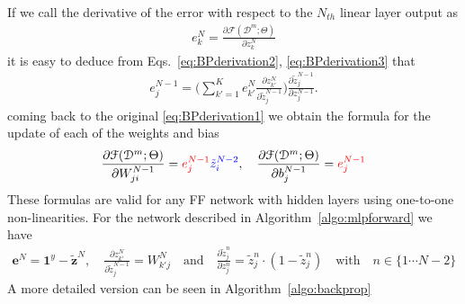 %
If we call the derivative of the error with respect to the $N_{th}$ linear layer output as
\begin{align}
        e^{N}_k = \frac{\partial \mathcal{F}(\mathcal{D}^m;\Theta)}{\partial z_{k}^{N}}
\label{eq:BPderivation4}
\end{align}
%
\noindent it is easy to deduce from Eqs.~\ref{eq:BPderivation2}, \ref{eq:BPderivation3} that
%
\begin{align}
        e^{N-1}_j = \bigg(\sum_{k'=1}^{K} e^N_{k'} \frac{\partial z_{k'}^{N}}{\partial \tilde{z}_{j}^{N-1}}\bigg)\frac{\partial \tilde{z}_{j}^{N-1}}{\partial z_{j}^{N-1}}.
\label{eq:BPderivation5}
\end{align}
%
\noindent coming back to the original \ref{eq:BPderivation1} we obtain the formula for the update of each of the weights and bias
%
\begin{align}
        \frac{\partial \mathcal{F}(\mathcal{D}^m;\Theta)}{\partial W_{ji}^{N-1}}  = {\color{red} e^{N-1}_j} {\color{blue} \tilde{z}_i^{N-2}},  \quad \frac{\partial \mathcal{F}(\mathcal{D}^m;\Theta)}{\partial b_{j}^{N-1}}  = {\color{red} e^{N-1}_j}
\label{eq:BPderivation6}
\end{align}
%
These formulas are valid for any FF network with hidden layers using one-to-one non-linearities. For the network described in Algorithm~\ref{algo:mlpforward} we have
%
\begin{align}
        \mathbf{e}^{N} =  \mathrm{\mathbf{1}}^{y} - \tilde{\mathbf{z}}^N,
  \quad
        \frac{\partial z_{k'}^N}{\partial \tilde{z}_j^{N-1}} = W_{k'j}^N \quad \mbox{and} \quad
        \frac{\partial \tilde{z}_{j}^n}{\partial z_{j}^n} = \tilde{z}^n_{j}\cdot (1-\tilde{z}^n_{j}) \quad \mbox{with} \quad n \in \{1 \cdots N-2\}
\label{eq:BPderivation7}
\end{align}
%
A more detailed version can be seen in Algorithm~\ref{algo:backprop}
